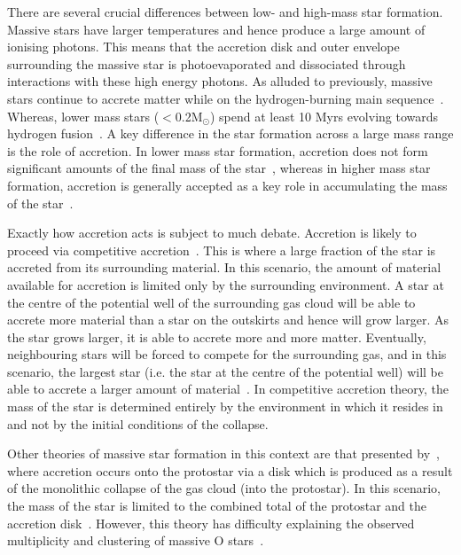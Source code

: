 There are several crucial differences between low- and high-mass star formation.\footnotemark~
Massive stars have larger temperatures and hence produce a large amount of ionising photons.
This means that the accretion disk and outer envelope surrounding the massive star is photoevaporated and dissociated through interactions with these high energy photons.
As alluded to previously, massive stars continue to accrete matter while on the hydrogen-burning main sequence~\citep{Zinnecker07}.
Whereas, lower mass stars ($ < $0.2M$_{\odot}$) spend at least 10 Myrs evolving towards hydrogen fusion~\citep{Luhman12}.
A key difference in the star formation across a large mass range is the role of accretion.
In lower mass star formation, accretion does not form significant amounts of the final mass of the star~\citep{Bonnell08}, whereas in higher mass star formation, accretion is generally accepted as a key role in accumulating the mass of the star~\citep{Kraus10}.


Exactly how accretion acts is subject to much debate.
Accretion is likely to proceed via competitive accretion~\citep{Bonnell01}.
This is where a large fraction of the star is accreted from its surrounding material.
In this scenario, the amount of material available for accretion is limited only by the surrounding environment.
A star at the centre of the potential well of the surrounding gas cloud will be able to accrete more material than a star on the outskirts and hence will grow larger.
As the star grows larger, it is able to accrete more and more matter.
Eventually, neighbouring stars will be forced to compete for the surrounding gas, and in this scenario, the largest star (i.e. the star at the centre of the potential well) will be able to accrete a larger amount of material~\citep[for a useful economical analogy, see Section 4.2 of][]{Zinnecker07}.
In competitive accretion theory, the mass of the star is determined entirely by the environment in which it resides in and not by the initial conditions of the collapse.

Other theories of massive star formation in this context are that presented by~\cite{Yorke02}, where accretion occurs onto the protostar via a disk which is produced as a result of the monolithic collapse of the gas cloud (into the protostar).
In this scenario, the mass of the star is limited to the combined total of the protostar and the accretion disk~\citep{Zinnecker07}.
However, this theory has difficulty explaining the observed multiplicity and clustering of massive O stars~\citep{Zinnecker07, Sana12, Kennicutt12}.

